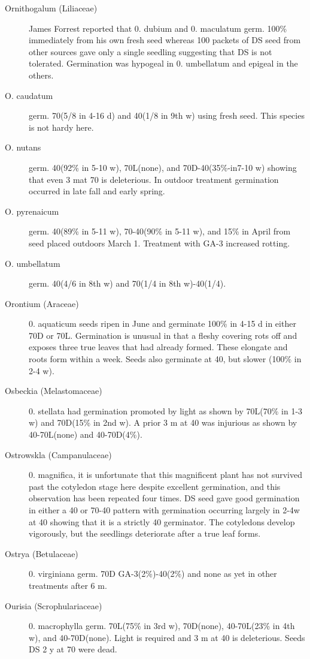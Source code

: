 \begin{description}
\item[Ornithogalum (Liliaceae)] James Forrest reported that 0. dubium and 0.
maculatum germ. 100\% immediately from his own fresh seed whereas 100 packets of
DS seed from other sources gave only a single seedling suggesting that DS is not
tolerated. Germination was hypogeal in 0. umbellatum and epigeal in the others.
\item[O. caudatum] germ. 70(5/8 in 4-16 d) and 40(1/8 in 9th w) using fresh seed. This
species is not hardy here.
\item[O. nutans] germ. 40(92\% in 5-10 w), 70L(none), and 70D-40(35\%-in7-10 w)
showing that even 3 mat 70 is deleterious. In outdoor treatment germination occurred
in late fall and early spring.
\item[O. pyrenaicum] germ. 40(89\% in 5-11 w), 70-40(90\% in 5-11 w), and 15\% in
April from seed placed outdoors March 1. Treatment with GA-3 increased rotting.
\item[O. umbellatum] germ. 40(4/6 in 8th w) and 70(1/4 in 8th w)-40(1/4).
\item[Orontium (Araceae)] 0. aquaticum seeds ripen in June and germinate
100\% in 4-15 d in either 70D or 70L. Germination is unusual in that a fleshy covering
rots off and exposes three true leaves that had already formed. These elongate and
roots form within a week. Seeds also germinate at 40, but slower (100\% in 2-4 w).
\item[Osbeckia (Melastomaceae)] 0. stellata had germination promoted by light
as shown by 70L(70\% in 1-3 w) and 70D(15\% in 2nd w). A prior 3 m at 40 was
injurious as shown by 40-70L(none) and 40-70D(4\%).
\item[Ostrowskla (Campanulaceae)] 0. magnifica, it is unfortunate that this
magnificent plant has not survived past the cotyledon stage here despite excellent
germination, and this observation has been repeated four times. DS seed gave good
germination in either a 40 or 70-40 pattern with germination occurring largely in 2-4w
at 40 showing that it is a strictly 40 germinator. The cotyledons develop vigorously, but
the seedlings deteriorate after a true leaf forms.
\item[Ostrya (Betulaceae)] 0. virginiana germ. 70D GA-3(2\%)-40(2\%) and none
as yet in other treatments after 6 m.
\item[Ourisia (Scrophulariaceae)] 0. macrophylla germ. 70L(75\% in 3rd w),
70D(none), 40-70L(23\% in 4th w), and 40-70D(none). Light is required and 3 m at 40
is deleterious. Seeds DS 2 y at 70 were dead.


\end{description}
